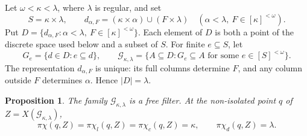 \documentclass[10pt,a4paper]{amsart}
\newtheorem{proposition}[theorem]{Proposition}
\theoremstyle{definition}
\theoremstyle{remark}
\newcommand{\G}{\mathcal G}
\newcommand{\pc}{\pi\chi}
\newcommand{\pcl}{\pi\chi_l}
\newcommand{\pcc}{\pi\chi_c}
\newcommand{\pcd}{\pi\chi_d}
\begin{document}
Let $\omega<\kappa<\lambda$, where $\lambda$ is regular, and set
\[
S=\kappa\times\lambda,\qquad
d_{\alpha,F}=(\kappa\times\alpha)\cup(F\times\lambda)
\quad(\alpha<\lambda,\ F\in[\kappa]^{<\omega}).
\]
Put $D=\{d_{\alpha,F}:\alpha<\lambda,\ F\in[\kappa]^{<\omega}\}$. Each element of $D$ is both a point of the discrete space used below and a subset of $S$. For finite $e\subseteq S$, let
\[
G_e=\{d\in D:e\subseteq d\},\qquad
\G_{\kappa,\lambda}=\{A\subseteq D:G_e\subseteq A
\text{ for some }e\in[S]^{<\omega}\}.
\]
The representation $d_{\alpha,F}$ is unique: its full columns determine $F$, and any column outside $F$ determines $\alpha$. Hence $|D|=\lambda$.

\begin{proposition}\label{prop:matrix}
The family $\G_{\kappa,\lambda}$ is a free filter. At the non-isolated point $q$ of $Z=X(\G_{\kappa,\lambda})$,
\[
\pc(q,Z)=\pcl(q,Z)=\pcc(q,Z)=\kappa,
\qquad \pcd(q,Z)=\lambda.
\]
\end{proposition}
\end{document}
